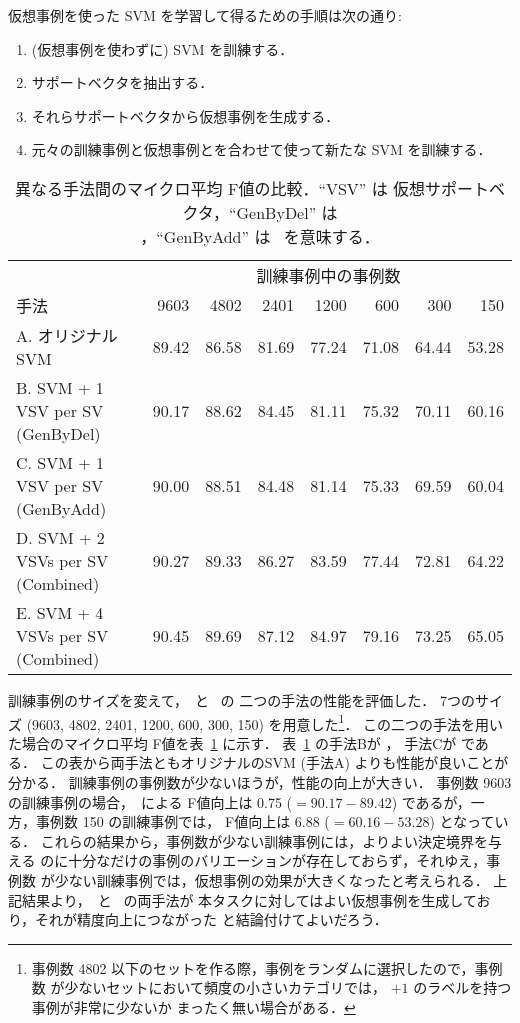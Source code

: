 仮想事例を使った SVM を学習して得るための手順は次の通り:
\begin{enumerate}
\item (仮想事例を使わずに) SVM を訓練する．
\item サポートベクタを抽出する．
\item それらサポートベクタから仮想事例を生成する．
\item 元々の訓練事例と仮想事例とを合わせて使って新たな SVM を訓練する．
\end{enumerate}

\begin{table}
\caption{異なる手法間のマイクロ平均 F値の比較．``VSV'' は
仮想サポートベクタ，``GenByDel'' は \\
\GenerateByDeletion，``GenByAdd'' は \GenerateByAddition\ を意味する．
}\label{tbl:pretest}
\begin{center}
\begin{tabular}{l|rrrrrrr} \hline\hline
    & \multicolumn{7}{c}{訓練事例中の事例数} \\ \cline{2-8}
手法 & 9603 & 4802 & 2401 & 1200 & 600 & 300 & 150 \\ \hline
A. オリジナル SVM & 89.42 & 86.58 & 81.69 & 77.24 & 71.08 & 64.44 & 53.28 \\
B. SVM + 1 VSV per SV (GenByDel) & 90.17 & 88.62 & 84.45 & 81.11 & 75.32 & 70.11 & 60.16 \\
C. SVM + 1 VSV per SV (GenByAdd) & 90.00 & 88.51 & 84.48 & 81.14
& 75.33 & 69.59 & 60.04 \\
D. SVM + 2 VSVs per SV (Combined) & 90.27 & 89.33 & 86.27 & 83.59 & 77.44
& 72.81 & 64.22 \\
E. SVM + 4 VSVs per SV (Combined) & 90.45 & 89.69 & 87.12 & 84.97 & 79.16 & 73.25 & 65.05
\\ \hline
\end{tabular}
\end{center}
\end{table}

訓練事例のサイズを変えて，\GenerateByDeletion\ と \GenerateByAddition\ の
二つの手法の性能を評価した．
7つのサイズ (9603, 4802, 2401, 1200, 600, 300, 150) を用意した\footnote{
事例数 4802 以下のセットを作る際，事例をランダムに選択したので，事例数
が少ないセットにおいて頻度の小さいカテゴリでは，
$+1$ のラベルを持つ事例が非常に少ないか
まったく無い場合がある．
}\<．
この二つの手法を用いた場合のマイクロ平均 F値を表~\ref{tbl:pretest} に示す．
表~\ref{tbl:pretest} の手法Bが \GenerateByDeletion{}，
手法Cが \GenerateByAddition{}である．
この表から両手法ともオリジナルのSVM (手法A) よりも性能が良いことが分かる．
訓練事例の事例数が少ないほうが，性能の向上が大きい．
事例数 9603 の訓練事例の場合，\GenerateByDeletion\ による F値向上は
 0.75 ($= 90.17 - 89.42$) であるが，一方，事例数 150 の訓練事例では，
F値向上は 6.88 ($= 60.16 - 53.28$) となっている．
これらの結果から，事例数が少ない訓練事例には，よりよい決定境界を与える
のに十分なだけの事例のバリエーションが存在しておらず，それゆえ，事例数
が少ない訓練事例では，仮想事例の効果が大きくなったと考えられる．
上記結果より，\GenerateByDeletion\ と \GenerateByAddition\ の両手法が
本タスクに対してはよい仮想事例を生成しており，それが精度向上につながった
と結論付けてよいだろう．

